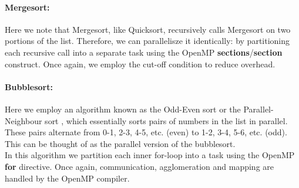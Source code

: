 \documentclass[10pt]{article}
\begin{document}
\paragraph{Mergesort:}
Here we note that Mergesort, like Quicksort, recursively calls Mergesort on two portions of the list. Therefore, we can parallelisze it identically: by partitioning each recursive call into a separate task using the OpenMP \textbf{sections}/\textbf{section} construct. Once again, we employ the cut-off condition to reduce overhead.
\paragraph{Bubblesort:}
Here we employ an algorithm known as the Odd-Even sort or the Parallel-Neighbour sort \cite{habermann72}, which essentially sorts pairs of numbers in the list in parallel. These pairs alternate from 0-1, 2-3, 4-5, etc. (even) to 1-2, 3-4, 5-6, etc. (odd). This can be thought of as the parallel version of the bubblesort.
\\
In this algorithm we partition each inner for-loop into a task using the OpenMP \textbf{for} directive. Once again, communication, agglomeration and mapping are handled by the OpenMP compiler.
\end{document}
